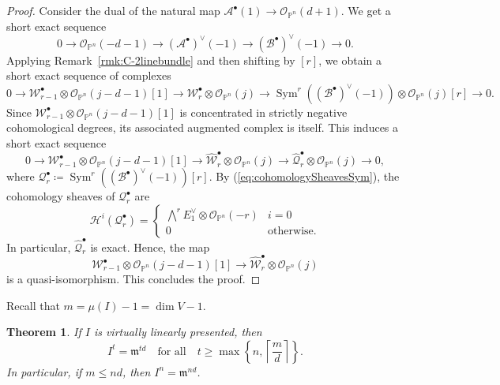 \documentclass[11pt,letterpaper,reqno]{amsart}
\newcommand{\m}{\mathfrak{m}}
\newcommand{\Sym}{\operatorname{Sym}}
\newcommand{\mc}[1]{\mathcal{#1}}
\def\PP{{\mathbb P}}
\def\lra{\longrightarrow}
\newtheorem{theorem}{Theorem}[section]
\theoremstyle{definition}
\numberwithin{equation}{section}
\begin{document}
\begin{proof}
    Consider the dual of the natural map $\mc{A}^\bullet (1) \lra \mc{O}_{\PP^n}(d+1)$. We get a short exact sequence 
    \[0 \lra \mc{O}_{\PP^n}(-d-1) \lra (\mc{A}^\bullet)^\vee (-1) \lra (\mc{B}^\bullet)^\vee (-1) \lra 0.\]
    Applying Remark~\ref{rmk:C-2linebundle} and then shifting by $[r]$, we obtain a short exact sequence of complexes
    \[0 \lra {\mc{W}^\bullet_{r-1} \otimes \mc{O}_{\PP^n}(j-d-1)[1]} \lra \mc{W}^\bullet_{r} \otimes \mc{O}_{\PP^n}(j) \lra \Sym^r((\mc{B}^\bullet)^\vee (-1)) \otimes \mc{O}_{\PP^n}(j)[r] \lra 0.\]
    Since ${\mc{W}^\bullet_{r-1} \otimes \mc{O}_{\PP^n}(j-d-1)[1]}$ is concentrated in strictly negative cohomological degrees, its associated augmented complex is itself. This induces a short exact sequence
    \[0 \lra {\mc{W}^\bullet_{r-1} \otimes \mc{O}_{\PP^n}(j-d-1)[1]} \lra \widehat{\mc{W}}^\bullet_{r} \otimes \mc{O}_{\PP^n}(j) \lra \widehat{\mc{Q}}^\bullet_r\otimes \mc{O}_{\PP^n}(j) \lra 0,\]
    where $\mc{Q}^\bullet_r \coloneqq \Sym^r((\mc{B}^\bullet)^\vee (-1))[r]$. By (\ref{eq:cohomologySheavesSym}), the cohomology sheaves of $\mc{Q}^\bullet_r$ are
    \[\mc{H}^{i}(\mc{Q}^\bullet_r) = \begin{cases}
        \bigwedge^r E_1^\vee \otimes \mc{O}_{\PP^n}(-r) & i = 0\\
        0 &\text{otherwise}.
    \end{cases}\]
    In particular, $\widehat{\mc{Q}}^\bullet_r$ is exact. Hence, the map
    \[{\mc{W}^\bullet_{r-1} \otimes \mc{O}_{\PP^n}(j-d-1)[1]} \lra \widehat{\mc{W}}^\bullet_{r} \otimes \mc{O}_{\PP^n}(j)\]
    is a quasi-isomorphism. This concludes the proof.
\end{proof}
\noindent Recall that $m = \mu(I) - 1 = \dim V - 1$.
\begin{theorem}\label{thm:lownumgen}
    If $I$ is virtually linearly presented, then 
    \[I^{t} = \m^{td} \quad \text{for all}\quad 
    t \ge \max\left\{ n, \left\lceil\frac{m}{d} \right\rceil\right\}.\]
    In particular, if $m\le nd$, then $I^n = \m^{nd}$.
\end{theorem}
\end{document}
